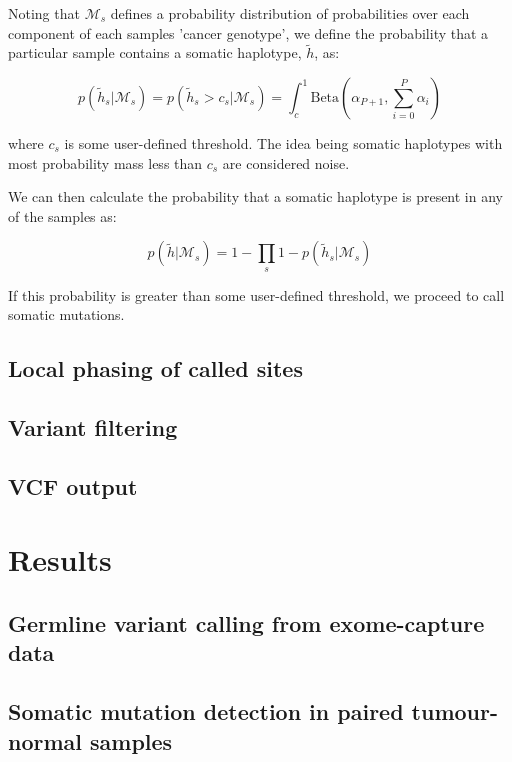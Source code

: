 \documentclass{article}
\begin{document}
Noting that $\mathcal{M}_s$ defines a probability distribution of probabilities over each component of each samples 'cancer genotype', we define the probability that a particular sample contains a somatic haplotype, $\tilde{h}$, as:

\begin{equation}
\label{eq:somatic_probability_sample}
p(\tilde{h}_s | \mathcal{M}_s) = p(\tilde{h}_s > c_s | \mathcal{M}_s) = \int_c^1 \text{Beta}(\alpha_{P + 1}, \sum_{i = 0}^{P} \alpha_i)
\end{equation}

\noindent where $c_s$ is some user-defined threshold. The idea being somatic haplotypes with most probability mass less than $c_s$ are considered noise.

We can then calculate the probability that a somatic haplotype is present in any of the samples as:

\begin{equation}
\label{eq:somatic_probability}
p(\tilde{h} | \mathcal{M}_s) = 1 - \prod_s 1 - p(\tilde{h}_s | \mathcal{M}_s)
\end{equation}

\noindent If this probability is greater than some user-defined threshold, we proceed to call somatic mutations.

\subsection{Local phasing of called sites}

\subsection{Variant filtering}

\subsection{VCF output}

\section{Results}

\subsection{Germline variant calling from exome-capture data}

\subsection{Somatic mutation detection in paired tumour-normal samples}
\end{document}
